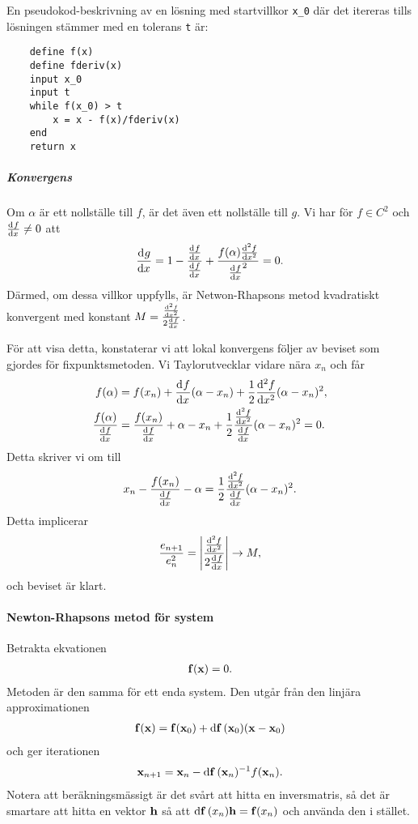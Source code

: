 En pseudokod-beskrivning av en lösning med startvillkor \verb|x_0| där det itereras tills lösningen stämmer med en tolerans \verb|t| är:
\begin{lstlisting}
	define f(x)
	define fderiv(x)
	input x_0
	input t
	while f(x_0) > t
		x = x - f(x)/fderiv(x)
	end
	return x
\end{lstlisting}

\subparagraph{Konvergens}
Om $\alpha$ är ett nollställe till $f$, är det även ett nollställe till $g$. Vi har för $f\in C^{2}$ och $\dv[]{f}{x} (\alpha) \neq 0$ att
\begin{align*}
	\dv[]{g}{x} (\alpha) = 1 - \frac{\dv[]{f}{x} (\alpha)}{\dv[]{f}{x} (\alpha)} + \frac{f(\alpha)\dv[2]{f}{x} (\alpha)}{\dv[]{f}{x} (\alpha)^{2}} = 0.
\end{align*}
Därmed, om dessa villkor uppfylls, är Netwon-Rhapsons metod kvadratiskt konvergent med konstant $M = \frac{\dv[2]{f}{x} (\alpha)}{2\dv[]{f}{x} (\alpha)}$.

För att visa detta, konstaterar vi att lokal konvergens följer av beviset som gjordes för fixpunktsmetoden. Vi Taylorutvecklar vidare nära $x_{n}$ och får
\begin{align*}
	f(\alpha)                            &= f(x_{n}) + \dv[]{f}{x} (x_{n})(\alpha - x_{n}) + \frac{1}{2}\dv[2]{f}{x} (c_{n})(\alpha - x_{n})^{2}, \\
	\frac{f(\alpha)}{\dv[]{f}{x} (x_{n})} &= \frac{f(x_{n})}{\dv[]{f}{x} (x_{n})} + \alpha - x_{n} + \frac{1}{2}\frac{\dv[2]{f}{x} (c_{n})}{\dv[]{f}{x} (x_{n})}(\alpha - x_{n})^{2} = 0.
\end{align*}
Detta skriver vi om till
\begin{align*}
	x_{n} - \frac{f(x_{n})}{\dv[]{f}{x} (x_{n})} - \alpha = \frac{1}{2}\frac{\dv[2]{f}{x} (c_{n})}{\dv[]{f}{x} (x_{n})}(\alpha - x_{n})^{2}.
\end{align*}
Detta implicerar
\begin{align*}
	\frac{e_{n + 1}}{e_{n}^{2}} = \abs{\frac{\dv[2]{f}{x} (c_{n})}{2\dv[]{f}{x} (x_{n})}} \to M,
\end{align*}
och beviset är klart.

\paragraph{Newton-Rhapsons metod för system}
Betrakta ekvationen
\begin{align*}
	\vb{f}(\vb{x}) = 0.
\end{align*}
Metoden är den samma för ett enda system. Den utgår från den linjära approximationen
\begin{align*}
	\vb{f}(\vb{x}) = \vb{f}(\vb{x}_{0}) + \dd{\vb{f}}(\vb{x}_{0})(\vb{x} - \vb{x}_{0})
\end{align*}
och ger iterationen
\begin{align*}
	\vb{x}_{n + 1} = \vb{x}_{n} - \dd{\vb{f}}(\vb{x}_{n})^{-1}f(\vb{x}_{n}).
\end{align*}
Notera att beräkningsmässigt är det svårt att hitta en inversmatris, så det är smartare att hitta en vektor $\vb{h}$ så att $\dd{\vb{f}}(x_{n})\vb{h} = \vb{f}(x_{n})$ och använda den i stället.